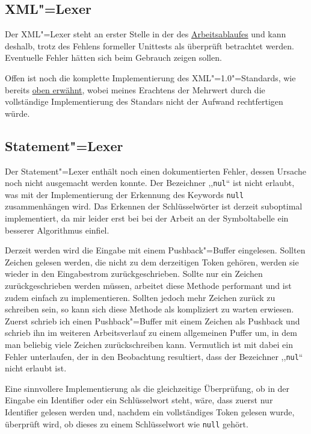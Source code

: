 \documentclass[10pt,a4paper,ngerman,titlepage,tocindentauto]{scrartcl}
\begin{document}
		\subsection{XML"=Lexer}
			Der XML"=Lexer steht an erster Stelle in der des \hyperlink{Verlaufdiagramm}{Arbeitsablaufes} und kann deshalb,
			trotz des Fehlens formeller Unittests als überprüft betrachtet werden. Eventuelle Fehler hätten sich
			beim Gebrauch zeigen sollen.
			
			Offen ist noch die komplette Implementierung des XML"=1.0"=Standards, wie bereits
			\hyperlink{Teilprojekte_XML_Lexer}{oben erwähnt}, wobei meines Erachtens der Mehrwert
			durch die vollständige Implementierung des Standars nicht der Aufwand rechtfertigen
			würde.
	
		\subsection{Statement"=Lexer}
			Der Statement"=Lexer enthält noch einen dokumentierten Fehler, dessen Ursache noch nicht ausgemacht werden konnte.
			Der Bezeichner ,,\texttt{nul}`` ist nicht erlaubt, was mit der Implementierung der Erkennung des Keywords
			\texttt{null} zusammenhängen wird. Das Erkennen der Schlüsselwörter ist derzeit suboptimal implementiert, da
			mir leider erst bei bei der Arbeit an der Symboltabelle ein besserer Algorithmus einfiel.
			
			Derzeit werden wird die Eingabe mit einem Pushback"=Buffer eingelesen. Sollten Zeichen gelesen werden,
			die nicht zu dem derzeitigen Token gehören, werden sie wieder in den Eingabestrom zurückgeschrieben.
			Sollte nur ein Zeichen zurückgeschrieben werden müssen, arbeitet diese Methode performant und ist zudem
			einfach zu implementieren. Sollten jedoch mehr Zeichen zurück zu schreiben sein, so kann sich diese Methode
			als kompliziert zu warten erwiesen. Zuerst schrieb ich einen Pushback"=Buffer mit einem Zeichen als
			Pushback und schrieb ihn im weiteren Arbeitsverlauf zu einem allgemeinen Puffer um, in dem man beliebig
			viele Zeichen zurückschreiben kann. Vermutlich ist mit dabei ein Fehler unterlaufen, der in den Beobachtung
			resultiert, dass der Bezeichner ,,\texttt{nul}`` nicht erlaubt ist.
			
			Eine sinnvollere Implementierung als die gleichzeitige Überprüfung, ob in der Eingabe ein Identifier oder
			ein Schlüsselwort steht, wäre, dass zuerst nur Identifier gelesen werden und, nachdem ein vollständiges
			Token gelesen wurde, überprüft wird, ob dieses zu einem Schlüsselwort wie \texttt{null} gehört.
	
\end{document}
